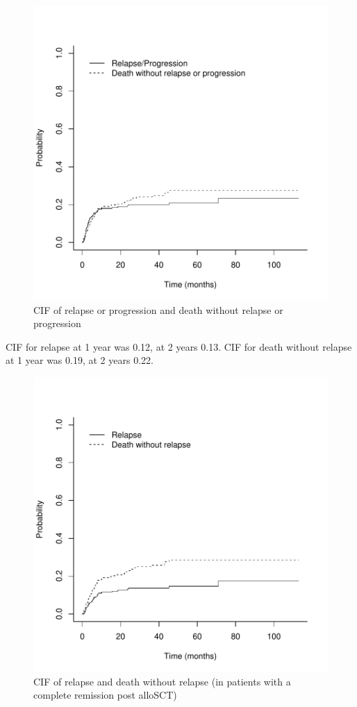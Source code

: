 \documentclass[a4paper,11pt] {article}
\begin{document}
\begin{figure}[h]
\begin{center}
\includegraphics{Rapport-fig6}
\end{center}
\caption{CIF of relapse or progression and death without relapse or progression}
\label{fig6}
\end{figure}

\pagebreak
CIF for relapse at 1 year was 0.12, at 2 years  0.13. CIF for death without relapse  at 1 year was 0.19, at 2 years  0.22. 

\begin{figure}[h]
\begin{center}
\includegraphics{Rapport-fig7}
\end{center}
\caption{CIF of relapse and death without relapse (in patients with a complete remission post alloSCT)}
\label{fig7}
\end{figure}
\end{document}
